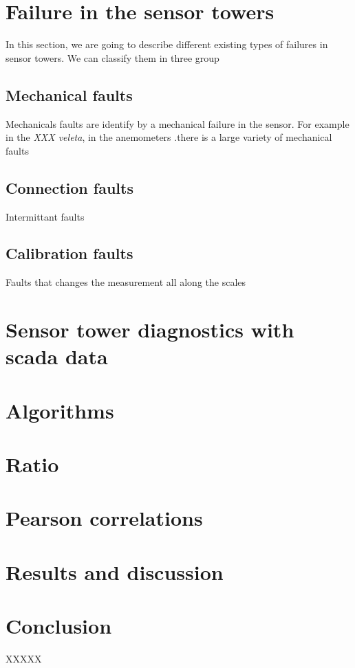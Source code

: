 \documentclass[journal]{IEEEtran}
\begin{document}
\section{Failure in the sensor towers}
In this section, we are going to describe different existing types of failures in sensor towers. We can classify them in three group
\subsection{Mechanical faults} Mechanicals faults are identify by a mechanical failure in the sensor. For example in the \emph{XXX veleta}, 
in the anemometers .there is a large variety of mechanical faults
\subsection{Connection  faults} Intermittant faults
\subsection{Calibration faults} Faults that changes the measurement all along the scales

\section{Sensor tower diagnostics with scada data}

\section{Algorithms}
\section{Ratio}
\section{Pearson correlations}
\section{Results and discussion}
\section{Conclusion}
XXXXX



\end{document}
